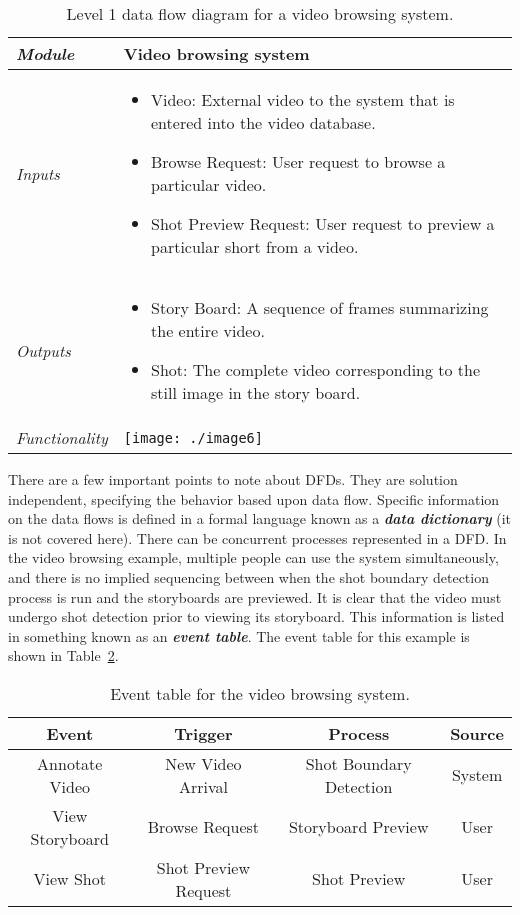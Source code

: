 \begin{table}[h]
\caption{Level 1 data flow diagram for a video browsing system.}
\label{table:dataflowVideoBrowse}
\begin{tabular}{|l|m{10cm}|}
\hline
\emph{Module} & Video browsing system \\ \hline

\emph{Inputs} & 
\begin{itemize}
\item
  Video: External video to the system that is entered into the video
  database.
\item
  Browse Request: User request to browse a particular video.
\item
  Shot Preview Request: User request to preview a particular short from
  a video.
\end{itemize}  \\ \hline
\emph{Outputs} & 
\begin{itemize}
\item
  Story Board: A sequence of frames summarizing the entire video.
\item
  Shot: The complete video corresponding to the still image in the story
  board.
\end{itemize}\\ \hline
\emph{Functionality} &
\texttt{[image: ./image6]} \\ \hline
\end{tabular}
\end{table}

There are a few important points to note about DFDs. They are solution
independent, specifying the behavior based upon data flow. Specific
information on the data flows is defined in a formal language known as a
\emph{\textbf{data dictionary}} (it is not covered here). There can be
concurrent processes represented in a DFD. In the video browsing
example, multiple people can use the system simultaneously, and there is
no implied sequencing between when the shot boundary detection process
is run and the storyboards are previewed. It is clear that the video
must undergo shot detection prior to viewing its storyboard. This
information is listed in something known as an \emph{\textbf{event
table}}. The event table for this example is shown in 
Table~\ref{table:videoBrowsingSystem}.

\begin{table}[h]
\caption{Event table for the video browsing system.}
\label{table:videoBrowsingSystem}
\begin{tabular}{|c|c|c|c|}
\hline
\rowcolor{Gray}
\textbf{Event} & \textbf{Trigger}& \textbf{Process} & \textbf{Source} \\ \hline
Annotate Video & New Video Arrival & Shot Boundary Detection & System \\  \hline
View Storyboard & Browse Request & Storyboard Preview & User \\ \hline
View Shot & Shot Preview Request & Shot Preview & User \\ \hline
\end{tabular}
\end{table}

